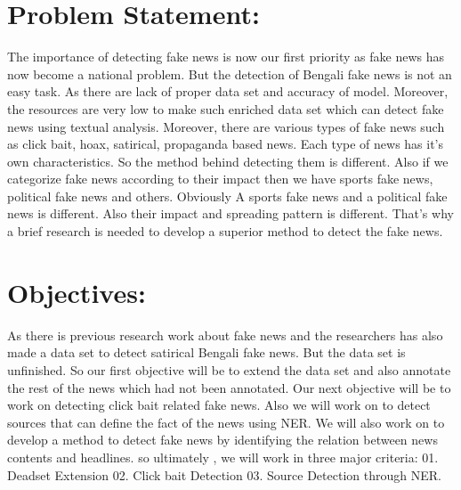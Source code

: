 \documentclass{article}
\begin{document}
        
      
		\section{Problem Statement:}
        
       The importance of detecting fake news is now our first priority as fake news has now become a national problem. But the detection of Bengali fake news is not an easy task. As there are lack of proper data set and accuracy of model. Moreover, the resources are very low to make such enriched data set which can detect fake news using textual analysis. Moreover, there are various types of fake news such as click bait, hoax, satirical, propaganda based news. Each type of news has it's own characteristics. So the method behind detecting them is different. Also if we categorize fake news according to their impact then we have sports fake news, political fake news and others. Obviously A sports fake news and a political fake news is different. Also their impact and spreading pattern is different. That's why a brief research is needed to develop a superior method to detect the fake news. 
       
             
      
        
	   	\section{Objectives:}
        
       As there is previous research work about fake news and the researchers has also made a data set to detect satirical Bengali fake news. But the data set is unfinished. So our first objective will be to extend the data set and also annotate the rest of the news which had not been annotated. Our next objective will be to work on detecting click bait related fake news. Also we will work on to detect sources that can define the fact of the news using NER. We will also work on to develop a method to detect fake news by identifying the relation between news contents and headlines. so ultimately , we will work in three major criteria: 
       01. Deadset Extension
       02. Click bait Detection
       03. Source Detection through NER.
        
       
\end{document}
